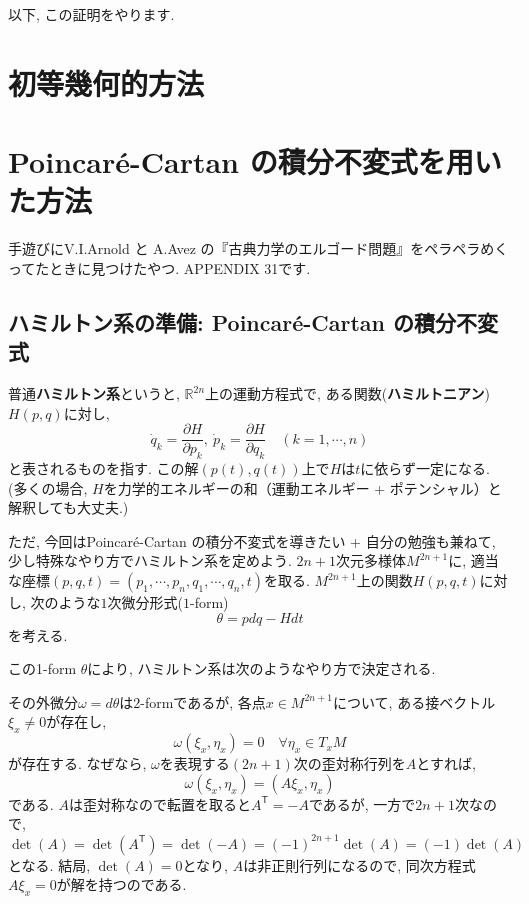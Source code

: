 \documentclass[a4paper]{ujarticle}
\numberwithin{equation}{section}
\theoremstyle{definition}
\begin{document}
    以下, この証明をやります.
\section{初等幾何的方法}

\section{Poincar\'{e}-Cartan の積分不変式を用いた方法}
    手遊びにV.I.Arnold と A.Avez の『古典力学のエルゴード問題』をペラペラめくってたときに見つけたやつ.
    APPENDIX 31です.

    \subsection{ハミルトン系の準備: Poincar\'{e}-Cartan の積分不変式}

    普通\textbf{ハミルトン系}というと, 
    $\mathbb{R}^{2n}$上の運動方程式で, ある関数(\textbf{ハミルトニアン})$H(p, q)$に対し, 
    \begin{equation} \label{ham}
        \dot{q}_{k} = \frac{\partial H}{\partial p_k}, \ \dot{p}_{k} = \frac{\partial H}{\partial q_k} \quad (k = 1, \cdots, n)
    \end{equation}
    と表されるものを指す.
    この解$(p(t), q(t))$上で$H$は$t$に依らず一定になる. 
    (多くの場合, $H$を力学的エネルギーの和（運動エネルギー + ポテンシャル）と解釈しても大丈夫.)

    ただ, 今回はPoincar\'{e}-Cartan の積分不変式を導きたい + 自分の勉強も兼ねて,
    少し特殊なやり方でハミルトン系を定めよう.
    \vspace{\baselineskip}
    $2n + 1$次元多様体$M^{2n + 1}$に, 適当な座標$(p, q, t) = (p_1, \cdots, p_n, q_1, \cdots, q_n, t)$を取る.
    $M^{2n + 1}$上の関数$H(p, q, t)$に対し, 
    次のような$1$次微分形式($1$-form)
    \begin{equation} \label{PC}
        \theta = p dq - H dt 
    \end{equation}
    を考える. 

    この1-form $\theta$により, ハミルトン系は次のようなやり方で決定される.

    その外微分$\omega = d \theta$は$2$-formであるが, 
    各点$x \in M^{2n + 1}$について, ある接ベクトル$\xi_x \neq 0$が存在し,
    \[
        \omega(\xi_x, \eta_x) = 0 \quad \forall \eta_x \in T_x M
    \]
    が存在する.
    なぜなら, $\omega$を表現する$(2n + 1)$次の歪対称行列を$A$とすれば, 
    \[
        \omega(\xi_x, \eta_x) = (A \xi_x, \eta_x)
    \]
    である. $A$は歪対称なので転置を取ると$A^{\textsf{T}} = -A$であるが,
    一方で$2n + 1$次なので, 
    \[
        \det(A) = \det(A^{\textsf{T}}) = \det(-A) = (-1)^{2n + 1} \det(A) = (-1) \det(A)
    \]
    となる. 結局, $\det(A) = 0$となり, $A$は非正則行列になるので, 
    同次方程式$A \xi_x = 0$が解を持つのである.
\end{document}
